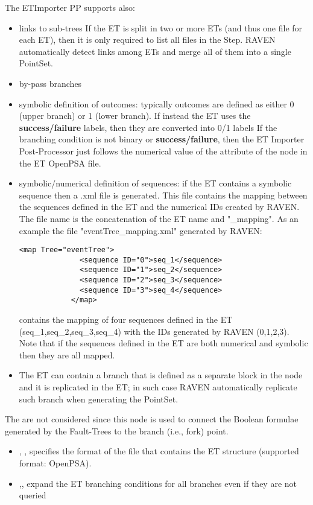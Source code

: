 The ETImporter PP supports also:
\begin{itemize}
  \item links to sub-trees
	      \nb If the ET is split in two or more ETs (and thus one file for each ET), then it is only required to list
	      all files in the Step. RAVEN automatically detect links among ETs and merge all of them into a single PointSet.
  \item by-pass branches
  \item symbolic definition of outcomes: typically outcomes are defined as either 0 (upper branch) or 1 (lower branch). If instead the ET uses the
    \textbf{success/failure} labels, then they are converted into 0/1 labels
    \nb If the branching condition is not binary or \textbf{success/failure}, then the ET Importer Post-Processor just follows
	   the numerical value of the  attribute of the  node in the ET OpenPSA file.
  \item symbolic/numerical definition of sequences: if the ET contains a symbolic sequence then a .xml file is generated.  This file contains
        the mapping between the sequences defined in the ET and the numerical IDs created by RAVEN. The file name is the concatenation of the ET name
        and "\_mapping". As an example the file "eventTree\_mapping.xml" generated by RAVEN:
        \begin{lstlisting}[style=XML]
            <map Tree="eventTree">
              <sequence ID="0">seq_1</sequence>
              <sequence ID="1">seq_2</sequence>
              <sequence ID="2">seq_3</sequence>
              <sequence ID="3">seq_4</sequence>
            </map>
        \end{lstlisting}
        contains the mapping of four sequences defined in the ET (seq\_1,seq\_2,seq\_3,seq\_4) with the IDs generated by RAVEN (0,1,2,3).
        Note that if the sequences defined in the ET are both numerical and symbolic then they are all mapped.
  \item The ET can contain a branch that is defined as a separate block in the  node and it is
        replicated in the ET; in such case RAVEN automatically replicate such branch when generating the PointSet.
\end{itemize}
The  are not considered since this node is used to connect the Boolean formulae generated by the
Fault-Trees to the branch (i.e., fork) point.

%
%
\begin{itemize}
  \item {}, , specifies the format of the file that contains the ET structure (supported format: OpenPSA).
  \item  {},, expand the ET branching conditions for all branches even if they are not queried
\end{itemize}

